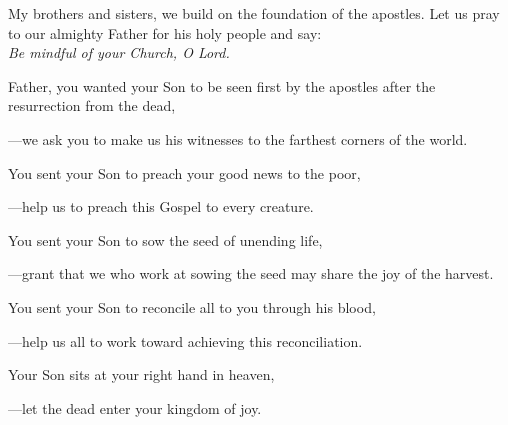 \intercessions\indent

\begin{hangpar}

My brothers and sisters, we build on the foundation of the apostles. Let us pray to our almighty Father for his holy people and say:\\
\emph{Be mindful of your Church, O Lord.}

\medskip Father, you wanted your Son to be seen first by the apostles after the resurrection from the dead,

{\color{red}---\thinspace}we ask you to make us his witnesses to the farthest corners of the world.

\medskip You sent your Son to preach your good news to the poor,

{\color{red}---\thinspace}help us to preach this Gospel to every creature.

\medskip You sent your Son to sow the seed of unending life,

{\color{red}---\thinspace}grant that we who work at sowing the seed may share the joy of the harvest.

\medskip You sent your Son to reconcile all to you through his blood,

{\color{red}---\thinspace}help us all to work toward achieving this reconciliation.

\medskip Your Son sits at your right hand in heaven,

{\color{red}---\thinspace}let the dead enter your kingdom of joy.

\end{hangpar}